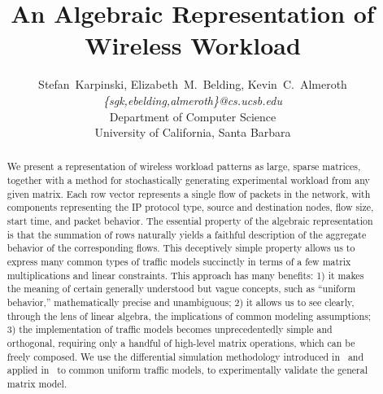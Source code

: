 \documentclass[conference]{IEEEtran}
\title{An Algebraic Representation of Wireless Workload}
\author{
{\large{Stefan~Karpinski, Elizabeth~M.~Belding, Kevin~C.~Almeroth}}\\
\textit{\{sgk,ebelding,almeroth\}@cs.ucsb.edu}\vspace{0.5em}\\
Department of Computer Science\\
University of California, Santa Barbara
\vspace{-0.5em}
}
\newcommand{\caps}[1]{{\small{#1}}}
\begin{document}
\maketitle

\begin{abstract}
We present a representation of wireless workload patterns as large, sparse matrices, together with a method for stochastically generating experimental workload from any given matrix. Each row vector represents a single flow of packets in the network, with components representing the \caps{IP} protocol type, source and destination nodes, flow size, start time, and packet behavior. The essential property of the algebraic representation is that the summation of rows naturally yields a faithful description of the aggregate behavior of the corresponding flows. This deceptively simple property allows us to express many common types of traffic models succinctly in terms of a few matrix multiplications and linear constraints. This approach has many benefits: 1) it makes the meaning of certain generally understood but vague concepts, such as ``uniform behavior,'' mathematically precise and unambiguous; 2) it allows us to see clearly, through the lens of linear algebra, the implications of common modeling assumptions; 3) the implementation of traffic models becomes unprecedentedly simple and orthogonal, requiring only a handful of high-level matrix operations, which can be freely composed.
We use the differential simulation methodology introduced in~\cite{Karpinski07:realism} and applied in~\cite{Karpinski07:cbr-failure} to common uniform traffic models, to experimentally validate the general matrix model. 
%
\end{abstract}
\end{document}
